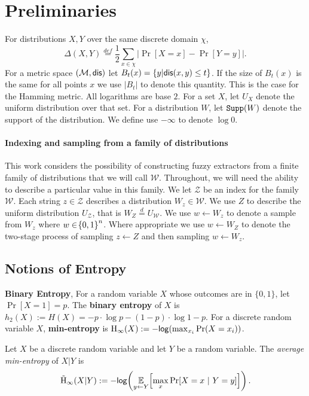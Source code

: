 
\section{Preliminaries}
\label{sec:prelim}
For distributions $X, Y$ over the same discrete domain $\chi$,
\[
\Delta(X, Y)\overset{def}= \frac{1}{2}\sum_{x \in \chi} \left| \Pr[X=x] - \Pr[Y=y]\right|.
\]
For a metric space $(\mathcal{M}, \mathsf{dis})$ let $B_t(x) = \{y | \mathsf{dis}(x, y)\le t\}$. If the size of $B_t(x)$ is the same for all points $x$ we use $|B_t|$ to denote this quantity. This is the case for the Hamming metric.  All logarithms are base $2$. For a set $X$, let $U_X$ denote the uniform distribution over that set.  For a distribution $W$, let $\mathtt{Supp}(W)$ denote the support of the distribution.  We define use $-\infty$ to denote $\log{0}$.

\paragraph{Indexing and sampling from a family of distributions}
This work considers the possibility of constructing fuzzy extractors from a finite family of distributions that we will call $\mathcal{W}$. 
Throughout, we will need the ability to describe a particular value in this family.  
We let $\mathcal{Z}$ be an index for the family $\mathcal{W}$. Each string $z\in\mathcal{Z}$ describes a distribution $W_z \in \mathcal{W}$. We use $Z$ to describe the uniform distribution $U_{\mathcal{Z}}$, that is $W_Z \overset{d}= U_{\mathcal{W}}$.  We use $w\leftarrow W_z$ to denote a sample from $W_z$ where  $w \in \!\left\{ 0,1 \right\}^{n}$.  Where appropriate we use $w\leftarrow W_Z$ to denote the two-stage process of sampling $z\leftarrow Z$ and then sampling $w\leftarrow W_z$.


\subsection{Notions of Entropy}
    \textbf{Binary Entropy}, %
    For a random variable $X$ whose outcomes are in $\{0,1\}$, let $\Pr[X=1] = p$. The \textbf{binary entropy} of $X$ is  $h_2(X) :=H(X)=-p\cdot\log{p} - (1-p)\cdot\log{1-p}.$ 
For a discrete random variable $X$, 
    \textbf{min-entropy} is $\mathrm{H}_{\infty}\!\left(X\right) := -\mathsf{log}\!\left(\max_{x_i} \Pr(X=x_i)\right)$.  
\begin{definition}
Let $X$ be a discrete random variable and let $Y$ be a random variable.  The \emph{average min-entropy} of $X|Y$ is  \[ \tilde{\mathrm{H}}_{\infty}\!\left(X|Y\right) := -\mathsf{log}\!\left(\operatorname*{\mathbb{E}}\limits_{y \leftarrow Y}\!\left[\max\limits_{x} \Pr\!\left[X = x\ |\ Y = y\right]\right]\right).\] 
\end{definition}

